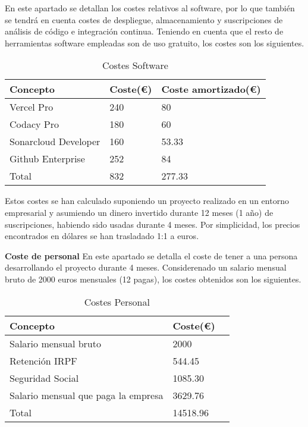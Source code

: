 En este apartado se detallan los costes relativos al software, por lo que también se tendrá en cuenta costes de despliegue, almacenamiento y suscripciones de análisis de código e integración continua. Teniendo en cuenta que el resto de herramientas software empleadas son de uso gratuito, los costes son los siguientes.
\begin{table}[H]
    \centering
    \begin{tabular}{@{}lll@{}}\toprule
         \textbf{Concepto} & \textbf{Coste(€)} & \textbf{Coste amortizado(€)} \\ \midrule
         Vercel Pro & 240 & 80\\
         Codacy Pro & 180 & 60\\
         Sonarcloud Developer & 160 & 53.33\\
         Github Enterprise & 252 & 84\\ \midrule
         Total & 832 & 277.33\\ \bottomrule
    \end{tabular}
    \caption{Costes Software}
    \label{ve:cost-soft}
\end{table}

Estos costes se han calculado suponiendo un proyecto realizado en un entorno empresarial y asumiendo un dinero invertido durante 12 meses (1 año) de suscripciones, habiendo sido usadas durante 4 meses. Por simplicidad, los precios encontrados en dólares se han trasladado 1:1 a euros.

\textbf{Coste de personal}
En este apartado se detalla el coste de tener a una persona desarrollando el proyecto durante 4 meses. Considerenado un salario mensual bruto de 2000 euros mensuales (12 pagas), los costes obtenidos son los siguientes.
\begin{table}[H]
    \centering
    \begin{tabular}{@{}lll@{}}\toprule
         \textbf{Concepto }& \textbf{Coste(€)} \\ \midrule
         Salario mensual bruto & 2000\\
         Retención IRPF & 544.45\\
         Seguridad Social & 1085.30\\
         Salario mensual que paga la empresa & 3629.76\\ \midrule
         Total & 14518.96\\ \bottomrule
    \end{tabular}
    \caption{Costes Personal}
    \label{ve:cost-per}
\end{table}

